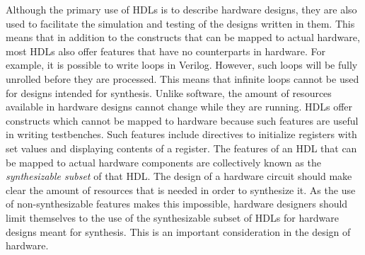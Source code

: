 Although the primary use of \glspl{HDL} is to describe hardware
designs, they are also used to facilitate the simulation and testing
of the designs written in them.
This means that in addition to the constructs that can be mapped to
actual hardware, most \glspl{HDL} also offer features that have no
counterparts in hardware.
%
%
For example, it is possible to write  loops in Verilog.
However, such loops will be fully unrolled before they are processed.
This means that infinite loops cannot be used for designs intended for
synthesis.
Unlike software, the amount of resources available in hardware designs
cannot change while they are running.
%
\glspl{HDL} offer constructs which cannot be mapped to hardware
because such features are useful in writing testbenches.
Such features include directives to initialize registers with set
values and displaying contents of a register.
The features of an \gls{HDL} that can be mapped to actual hardware
components are collectively known as the \emph{synthesizable subset}
of that \gls{HDL}.
The design of a hardware circuit should make clear the amount of
resources that is needed in order to synthesize it.
As the use of non-synthesizable features makes this impossible,
hardware designers should limit themselves to the use of the
synthesizable subset of \glspl{HDL} for hardware designs meant for
synthesis.
This is an important consideration in the design of hardware.
%

